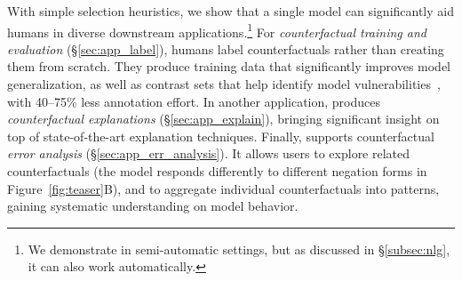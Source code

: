 
With simple selection heuristics, we show that a single \sysname model can significantly aid humans in diverse downstream applications.\footnote{We demonstrate \sysname in semi-automatic settings, but as discussed in \S\ref{subsec:nlg}, it can also work automatically.} 
For \emph{counterfactual training and evaluation} (\S\ref{sec:app_label}), humans label \sysname counterfactuals rather than creating them from scratch.
They produce training data that significantly improves model generalization, as well as contrast sets that help identify model vulnerabilities~\cite{gardner2020contrast}, with 40--75\% less annotation effort. 
In another application, \sysname produces \emph{counterfactual explanations} (\S\ref{sec:app_explain}), bringing significant insight on top of state-of-the-art explanation techniques. 
Finally, \sysname supports counterfactual \emph{error analysis} (\S\ref{sec:app_err_analysis}).
It allows users to explore related counterfactuals (\eg the model responds differently to different negation forms in Figure~\ref{fig:teaser}B), and to aggregate individual counterfactuals into patterns, gaining systematic understanding on model behavior.



